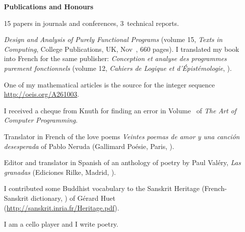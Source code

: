 \documentclass[a4paper,11pt]{article}
\begin{document}
\bigskip
\noindent\textbf{\large Publications and Honours}
\bigskip
\begin{itemize*}

  \item 15 papers in journals and conferences, 3~technical reports.

  \item \textit{Design and Analysis of Purely Functional Programs}
    (volume 15, \emph{Texts in Computing}, College Publications, UK,
    Nov~, 660 pages). I translated my book into
    French for the same publisher: \textit{Conception et analyse des
      programmes purement fonctionnels} (volume 12, \emph{Cahiers de
    Logique et d'Épistémologie}, ).

  \item One of my mathematical articles is the source for the integer
    sequence \url{http://oeis.org/A261003}.

  \item I received a cheque from Knuth for finding an error in
    Volume~ of \emph{The Art of Computer Programming}.

  \item Translator in French of the love poems \textit{Veintes poemas
    de amor y una canci\'on desesperada} of Pablo Neruda (Gallimard
    Po\'esie, Paris, ).

  \item Editor and translator in Spanish of an anthology of poetry by
    Paul Val\'ery, \emph{Las granadas} (Ediciones Rilke, Madrid,
    ).

  \item I contributed some Buddhist vocabulary to the Sanskrit
    Heritage (French-Sanskrit dictionary, ) of
    G\'{e}rard Huet\\ (\url{http://sanskrit.inria.fr/Heritage.pdf}).

  \item I am a cello player and I write poetry.

\end{itemize*}


%
\nocite{*}
\end{document}
